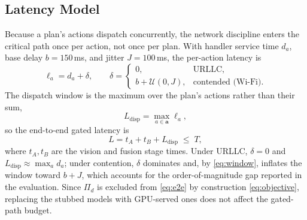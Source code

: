 \subsection{\textbf{Latency Model}}
\label{sec:latency}
Because a plan's actions dispatch concurrently, the network discipline enters the
critical path once per action, not once per plan. With handler service time
$d_a$, base delay $b=150$\,ms, and jitter $J=100$\,ms, the per-action latency is
\begin{equation}
\ell_a = d_a + \delta,\qquad
\delta =
\begin{cases}
0, & \text{URLLC},\\[2pt]
b + \mathcal{U}(0,J), & \text{contended (Wi-Fi).}
\end{cases}
\label{eq:peraction}
\end{equation}
The dispatch window is the maximum over the plan's actions rather than their sum,
\begin{equation}
L_{\text{disp}} = \max_{a\in\mathbf{a}} \ell_a,
\label{eq:window}
\end{equation}
so the end-to-end gated latency is
\begin{equation}
L = t_{A} + t_{B} + L_{\text{disp}} \;\le\; T,
\label{eq:e2e}
\end{equation}
where $t_A,t_B$ are the vision and fusion stage times. Under URLLC, $\delta=0$ and
$L_{\text{disp}}\!\approx\!\max_a d_a$; under contention, $\delta$ dominates and,
by \eqref{eq:window}, inflates the window toward $b+J$, which accounts for the
order-of-magnitude gap reported in the evaluation. Since $\Pi_d$ is excluded from
\eqref{eq:e2e} by construction \eqref{eq:objective}, replacing the stubbed models
with GPU-served ones does not affect the gated-path budget.
